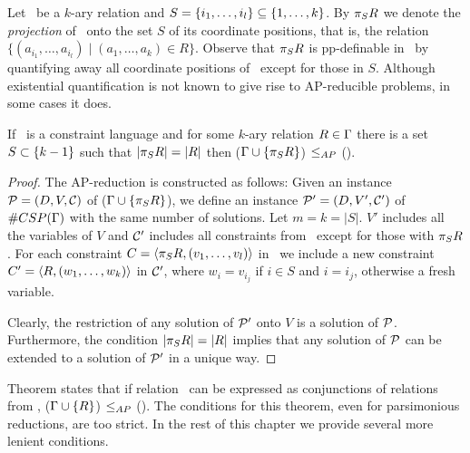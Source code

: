Let \mR\ be a \(k\)-ary relation and \(S=\{{i_1,\dotsc,i_l}\} \subseteq \{{1,\dotsc,k}\}\)\@.
By \(\pi_{S}{R}\) we denote the \emph{projection} of \mR\ onto the set \(S\) of its coordinate
positions, that is, the relation \(\{(a_{i_1},\dotsc,a_{i_l}) \mid (a_1,\dotsc,a_k)\in R\}\)\@.
Observe that \(\pi_{S}{R}\) is pp-definable in \mR\ by quantifying away all coordinate
positions of \mR\ except for those in \(S\)\@.
Although existential quantification is not known to give rise to AP-reducible problems, in some
cases it does.

\begin{lemma}\label{lem:projection}
If \mrelset\ is a constraint language and for some \(k\)-ary relation \(R\in\Gamma\)
there is a set \(S\subset \{{k-1}\}\) such that \(|\pi_{S}{R}|=|R|\) then 
\ccsp(\(\Gamma \cup \{{\pi_{S}{R}}\}\)) \(\le_{AP}\) \ccsp(\mrelset)\@.
\end{lemma}

\begin{proof}
The AP-reduction is constructed as follows: Given an instance \(\mathcal{P}=(D,V,\mathcal{C})\)
of \ccsp(\(\Gamma\cup \{\pi_{S}{R}\}\)), we define an 
instance \(\mathcal{P}'=(D,V',\mathcal{C}')\) of \(\#CSP(\Gamma)\) with the same number of solutions.
Let \(m=k=|S|\)\@. \(V'\) includes all the variables of \(V\) and
\(\mathcal{C}'\) includes all constraints from \mconset\ except for those with \(\pi_{S}{R}\). For each
constraint \(C=\langle \pi_{S}{R},(v_1,\dotsc,v_l) \rangle\) in \mconset\ 
we include a new constraint \(C'=\langle R,(w_1,\dotsc,w_k) \rangle\) in \(\mathcal{C}'\), where 
\(w_i=v_{i_j}\) if \(i\in S\) and \(i=i_j\), otherwise a fresh variable.

Clearly, the restriction of any solution of \(\mathcal{P}'\) onto \(V\) is a solution of \(\mathcal{P}\)\@.
Furthermore, the condition \(|\pi_{S}{R}|=|R|\) implies that any solution of \(\mathcal{P}\)
can be extended to a solution of \(\mathcal{P}'\) in a unique way.
\end{proof}


Theorem \label{trm:partial} states that if relation \mR\ can be expressed as conjunctions 
of relations from \mrelset, \ccsp(\(\Gamma \cup \{{R}\}\)) \(\le_{AP}\) \ccsp(\mrelset)\@.
The conditions for this theorem, even for parsimonious reductions, are too strict. 
In the rest of this chapter we provide several more lenient conditions.

